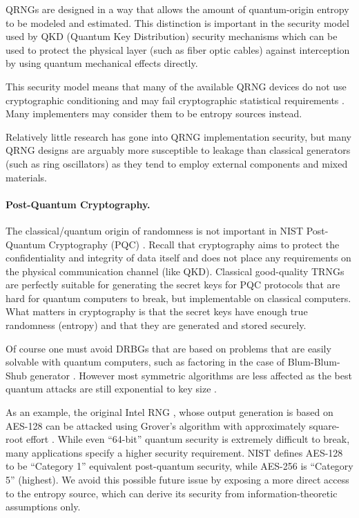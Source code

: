     QRNGs are designed in a way that allows the amount of quantum-origin
    entropy to be modeled and estimated. This distinction is important in
    the security model used by QKD (Quantum Key Distribution) security
    mechanisms which can be used to protect the physical layer (such as
    fiber optic cables) against interception by using quantum mechanical
    effects directly.

    This security model means that many of the available
    QRNG devices do not use cryptographic conditioning and may fail
    cryptographic statistical requirements \cite{HuHe20}. Many implementers
    may consider them to be entropy sources instead.

    Relatively little research has gone into QRNG implementation security,
    but many QRNG designs are arguably more susceptible to leakage than
    classical generators (such as ring oscillators) as they tend to employ
    external components and mixed materials.

    \paragraph{Post-Quantum Cryptography.}
    The classical/quantum origin of randomness is not important in NIST
    Post-Quantum Cryptography (PQC) \cite{NI16}. Recall that cryptography
    aims to protect the confidentiality and integrity of data itself
    and does not place any requirements on the physical communication
    channel (like QKD). Classical good-quality TRNGs are perfectly suitable
    for generating the secret keys for PQC protocols that are hard for
    quantum computers to break, but implementable on classical computers.
    What matters in cryptography is that the secret keys have enough true
    randomness (entropy) and that they are generated and stored securely.

    Of course one must avoid DRBGs that are based on problems that are
    easily solvable with quantum computers, such as factoring \cite{Sh94}
    in the case of Blum-Blum-Shub generator \cite{BlBlSh86}. However
    most symmetric algorithms are less affected as the best quantum
    attacks are still exponential to key size \cite{Gr96}.

    As an example, the original Intel RNG \cite{Me18}, whose output
    generation is based on AES-128 can be attacked using Grover's algorithm
    with approximately square-root effort \cite{JaNaRo+20}.
    While even ``64-bit'' quantum security is extremely difficult to
    break, many applications specify a higher security requirement.
    NIST \cite{NI16} defines AES-128 to be ``Category 1'' equivalent
    post-quantum security, while AES-256 is ``Category 5'' (highest).
    We avoid this possible future issue by exposing a more direct access
    to the entropy source, which can derive its security from
    information-theoretic assumptions only.



